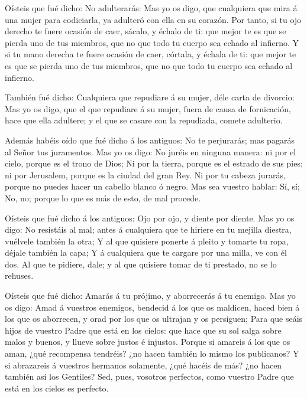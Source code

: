  Oísteis que fué dicho: No adulterarás:  Mas
yo os digo, que cualquiera que mira á una mujer para codiciarla, ya
adulteró con ella en su corazón.  Por tanto, si tu ojo
derecho te fuere ocasión de caer, sácalo, y échalo de ti: que mejor te
es que se pierda uno de tus miembros, que no que todo tu cuerpo sea
echado al infierno.  Y si tu mano derecha te fuere ocasión
de caer, córtala, y échala de ti: que mejor te es que se pierda uno de
tus miembros, que no que todo tu cuerpo sea echado al infierno.

 También fué dicho: Cualquiera que repudiare á su mujer,
déle carta de divorcio:  Mas yo os digo, que el que
repudiare á su mujer, fuera de causa de fornicación, hace que ella
adultere; y el que se casare con la repudiada, comete adulterio.

 Además habéis oído que fué dicho á los antiguos: No te
perjurarás; mas pagarás al Señor tus juramentos.  Mas yo os
digo: No juréis en ninguna manera: ni por el cielo, porque es el trono
de Dios;  Ni por la tierra, porque es el estrado de sus
pies; ni por Jerusalem, porque es la ciudad del gran Rey. 
Ni por tu cabeza jurarás, porque no puedes hacer un cabello blanco ó
negro.  Mas sea vuestro hablar: Sí, sí; No, no; porque lo
que es más de esto, de mal procede.

 Oísteis que fué dicho á los antiguos: Ojo por ojo, y
diente por diente.  Mas yo os digo: No resistáis al mal;
antes á cualquiera que te hiriere en tu mejilla diestra, vuélvele
también la otra;  Y al que quisiere ponerte á pleito y
tomarte tu ropa, déjale también la capa;  Y á cualquiera
que te cargare por una milla, ve con él dos.  Al que te
pidiere, dale; y al que quisiere tomar de ti prestado, no se lo rehuses.

 Oísteis que fué dicho: Amarás á tu prójimo, y aborrecerás
á tu enemigo.  Mas yo os digo: Amad á vuestros enemigos,
bendecid á los que os maldicen, haced bien á los que os aborrecen, y
orad por los que os ultrajan y os persiguen;  Para que
seáis hijos de vuestro Padre que está en los cielos: que hace que su sol
salga sobre malos y buenos, y llueve sobre justos é injustos.
 Porque si amareis á los que os aman, ¿qué recompensa
tendréis? ¿no hacen también lo mismo los publicanos?  Y si
abrazareis á vuestros hermanos solamente, ¿qué hacéis de más? ¿no hacen
también así los Gentiles?  Sed, pues, vosotros perfectos,
como vuestro Padre que está en los cielos es perfecto.

